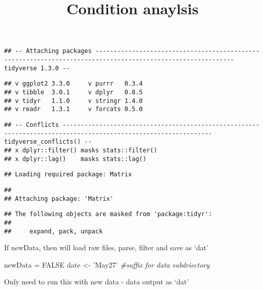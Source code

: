 \documentclass[
  landscape]{article}
\title{Condition anaylsis}
\author{}
\date{\vspace{-2.5em}}
\newenvironment{Shaded}{\begin{snugshade}}{\end{snugshade}}
\newcommand{\CommentTok}[1]{\textcolor[rgb]{0.56,0.35,0.01}{\textit{#1}}}
\newcommand{\NormalTok}[1]{#1}
\newcommand{\OtherTok}[1]{\textcolor[rgb]{0.56,0.35,0.01}{#1}}
\newcommand{\StringTok}[1]{\textcolor[rgb]{0.31,0.60,0.02}{#1}}
\begin{document}
\maketitle

\begin{verbatim}
## -- Attaching packages ------------------------------------------------------------------------------------------------------------ tidyverse 1.3.0 --
\end{verbatim}

\begin{verbatim}
## v ggplot2 3.3.0     v purrr   0.3.4
## v tibble  3.0.1     v dplyr   0.8.5
## v tidyr   1.1.0     v stringr 1.4.0
## v readr   1.3.1     v forcats 0.5.0
\end{verbatim}

\begin{verbatim}
## -- Conflicts --------------------------------------------------------------------------------------------------------------- tidyverse_conflicts() --
## x dplyr::filter() masks stats::filter()
## x dplyr::lag()    masks stats::lag()
\end{verbatim}

\begin{verbatim}
## Loading required package: Matrix
\end{verbatim}

\begin{verbatim}
## 
## Attaching package: 'Matrix'
\end{verbatim}

\begin{verbatim}
## The following objects are masked from 'package:tidyr':
## 
##     expand, pack, unpack
\end{verbatim}

If newData, then will load raw files, parse, filter and save as `dat'

\begin{Shaded}
\begin{Highlighting}[]
\NormalTok{newData =}\StringTok{ }\OtherTok{FALSE}
\NormalTok{date <-}\StringTok{ 'May27'} \CommentTok{#suffix for data subdriectory}
\end{Highlighting}
\end{Shaded}

Only need to run this with new data - data output as `dat'
\end{document}
